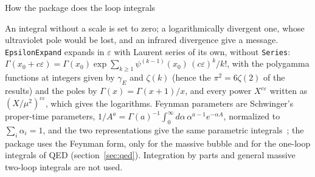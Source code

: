 \documentclass[11pt,a4paper]{article}
\newcommand{\pkg}[1]{\texttt{#1}}
\begin{document}
\begin{methodbox}{How the package does the loop integrals}
\begin{itemize}[leftmargin=1.2em, itemsep=1pt, topsep=2pt]
\end{itemize}
An integral without a scale is set to zero; a logarithmically divergent one, whose ultraviolet pole would be lost, and an
infrared divergence give a message. \pkg{EpsilonExpand} expands in $\varepsilon$ with Laurent series of its own, without
\pkg{Series}: $\Gamma(x_0+c\varepsilon)=\Gamma(x_0)\exp\sum_{k\ge1}\psi^{(k-1)}(x_0)\,(c\varepsilon)^k/k!$, with the
polygamma functions at integers given by $\gamma_E$ and $\zeta(k)$ (hence the $\pi^2=6\zeta(2)$ of the results) and the
poles by $\Gamma(x)=\Gamma(x+1)/x$, and every power $X^{c\varepsilon}$ written as $(X/\mu^2)^{c\varepsilon}$, which gives the
logarithms. Feynman parameters are Schwinger's proper-time parameters, $1/A^a=\Gamma(a)^{-1}\int_0^\infty
d\alpha\,\alpha^{a-1}e^{-\alpha A}$, normalized to $\sum_i\alpha_i=1$, and the two representations give the same parametric
integrals~\cite{Smirnov2012}; the package uses the Feynman form, only for the massive bubble and for the one-loop
integrals of QED (section~\ref{sec:qed}). Integration by parts and general massive two-loop integrals are not used.
\end{methodbox}
\end{document}
